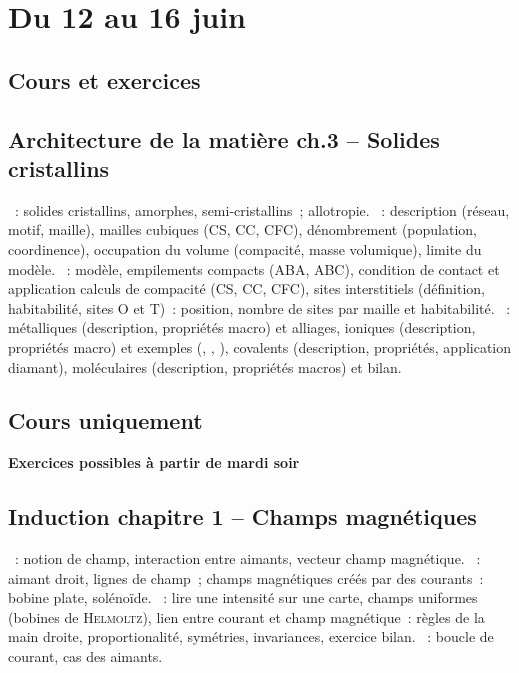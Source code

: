 \documentclass[a4paper, 11pt, final, garamond]{book}
\begin{document}
\setcounter{chapter}{29}

\chapter{Du 12 au 16 juin}

\section{Cours et exercices}
\section*{Architecture de la matière ch.3 -- Solides cristallins}
\begin{enumerate}[label=\Roman*]
	~: solides cristallins, amorphes,
	semi-cristallins~; allotropie.
	~: description (réseau, motif, maille),
	mailles cubiques (CS, CC, CFC), dénombrement (population, coordinence),
	occupation du volume (compacité, masse volumique), limite du modèle.
	~: modèle, empilements compacts (ABA,
	ABC), condition de contact et application calculs de compacité (CS, CC,
	CFC), sites interstitiels (définition, habitabilité, sites O et T)~:
	position, nombre de sites par maille et habitabilité.
	~: métalliques (description, propriétés
	macro) et alliages, ioniques (description, propriétés macro) et exemples
	(, , ), covalents (description, propriétés,
	application diamant), moléculaires (description, propriétés macros) et bilan.
\end{enumerate}

\section{Cours uniquement}
\begin{center}
	\begin{framed}
		\Large \bfseries
		Exercices possibles à partir de mardi soir
	\end{framed}
\end{center}
\section*{Induction chapitre 1 -- Champs magnétiques}
\begin{enumerate}[label=\Roman*]
	~: notion de champ, interaction entre aimants, vecteur
	champ magnétique.
	~: aimant droit, lignes de
	champ~; champs magnétiques créés par des courants~: bobine plate, solénoïde.
	~: lire une intensité sur une carte,
	champs uniformes (bobines de \textsc{Helmoltz}), lien entre courant et champ
	magnétique~: règles de la main droite, proportionalité, symétries,
	invariances, exercice bilan.
	~: boucle de courant, cas des aimants.
\end{enumerate}
\end{document}
